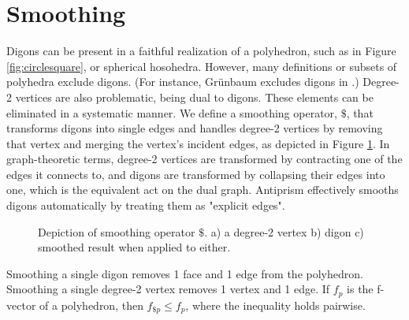 \documentclass{amsart}[12pt]
\begin{document}
\section{Smoothing}

Digons can be present in a faithful realization of a polyhedron, such as in
Figure \ref{fig:circlesquare}, or spherical hosohedra. However, many
definitions or subsets of polyhedra exclude digons. (For instance, Gr\"unbaum
excludes digons in \cite{grunbaum03}.) Degree-2 vertices are also problematic,
being dual to digons. These elements can be eliminated in a systematic manner.
We define a smoothing operator, $\$$, that transforms digons into single edges
and handles degree-2 vertices by removing that vertex and merging the vertex's
incident edges, as depicted in Figure \ref{fig:smooth}. In graph-theoretic
terms, degree-2 vertices are transformed by contracting one of the edges it
connects to, and digons are transformed by collapsing their edges into one,
which is the equivalent act on the dual graph. \cite{gross} Antiprism
effectively smooths digons automatically by treating them as "explicit edges".

\begin{figure} [!htbp]

\caption{Depiction of smoothing operator $\$$. a) a degree-2 vertex b) digon c)
        smoothed result when applied to either.}
\label{fig:smooth}
\end{figure}

Smoothing a single digon removes 1 face and 1 edge from the polyhedron.
Smoothing a single degree-2 vertex removes 1 vertex and 1 edge.
If $f_p$ is the f-vector of a polyhedron, then $f_{\$p} \le f_p$, where the
inequality holds pairwise.
\end{document}
